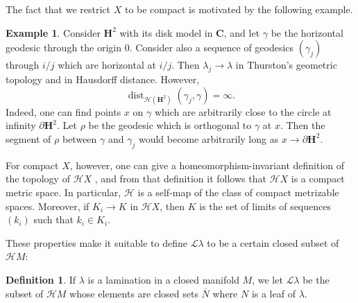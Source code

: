 \documentclass[reqno,11pt]{amsart}
\newcommand{\CC}{\mathbf{C}}
\newcommand{\Hyp}{\mathbf H}
\DeclareMathOperator{\dist}{dist}
\newcommand{\Leaves}{\mathscr L}
\newcommand{\Hypspace}{\mathscr H}
\theoremstyle{definition}
\newtheorem{definition}[theorem]{Definition}
\newtheorem{example}[theorem]{Example}
\numberwithin{equation}{section}
\begin{document}
The fact that we restrict $X$ to be compact is motivated by the following example.

\begin{example}
Consider $\Hyp^2$ with its disk model in $\CC$, and let $\gamma$ be the horizontal geodesic through the origin $0$.
Consider also a sequence of geodesics $(\gamma_j)$ through $i/j$ which are horizontal at $i/j$.
Then $\lambda_j \to \lambda$ in Thurston's geometric topology and in Hausdorff distance.
However,
$$\dist_{\mathscr H(\Hyp^2)}(\gamma_j, \gamma) = \infty.$$
Indeed, one can find points $x$ on $\gamma$ which are arbitrarily close to the circle at infinity $\partial \Hyp^2$.
Let $\rho$ be the geodesic which is orthogonal to $\gamma$ at $x$.
Then the segment of $\rho$ between $\gamma$ and $\gamma_j$ would become arbitrarily long as $x \to \partial \Hyp^2$.
\end{example}

For compact $X$, however, one can give a homeomorphism-invariant definition of the topology of $\Hypspace X$ \cite[Chapter 4]{nadler2017continuum}, and from that definition it follows that $\Hypspace X$ is a compact metric space.
In particular, $\Hypspace$ is a self-map of the class of compact metrizable spaces.
Moreover, if $K_i \to K$ in $\Hypspace X$, then $K$ is the set of limits of sequences $(k_i)$ such that $k_i \in K_i$.

These properties make it suitable to define $\Leaves \lambda$ to be a certain closed subset of $\Hypspace M$:

\begin{definition}
If $\lambda$ is a lamination in a closed manifold $M$, we let $\Leaves \lambda$ be the subset of $\Hypspace M$ whose elements are closed sets $\overline N$ where $N$ is a leaf of $\lambda$.
\end{definition}
\end{document}
